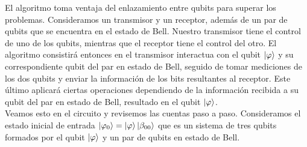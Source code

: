 \documentclass[a4paper]{article}
\numberwithin{equation}{section}
\begin{document}
El algoritmo toma ventaja del enlazamiento entre qubits para superar los problemas. Consideramos un transmisor y un receptor, además de un par de qubits que se encuentra en el estado de Bell. Nuestro transmisor tiene el control de uno de los qubits, mientras que el receptor tiene el control del otro. El algoritmo consistirá entonces en el transmisor interactua con el qubit $\ket{\varphi}$ y su correspondiente qubit del par en estado de Bell, seguido de tomar mediciones de los dos qubits y enviar la información de los bits resultantes al receptor. Este último aplicará ciertas operaciones dependiendo de la información recibida a su qubit del par en estado de Bell, resultado en el qubit $\ket{\varphi}$.\\
Veamos esto en el circuito y revisemos las cuentas paso a paso. Consideramos el estado inicial de entrada $\ket{\varphi_0} = \ket{\varphi}\ket{\beta_{00}}$ que es un sistema de tres qubits formados por el qubit $\ket{\varphi}$ y un par de qubits en estado de Bell.
\end{document}
